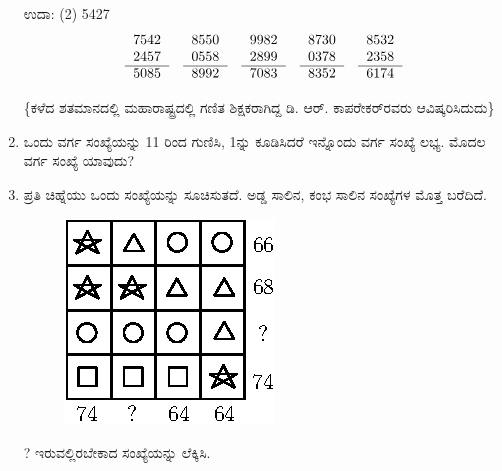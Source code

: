 \begin{enumerate}
ಉದಾ: (2) 5427
\begin{equation*}
\begin{tabular}[t]{r}
7542 \\
2457\\\cline{1-1} 
5085
\end{tabular}
\quad
\begin{tabular}[t]{r}
8550\\ 
0558\\\cline{1-1} 
8992
\end{tabular}
\quad
\begin{tabular}[t]{r}
9982\\ 
2899\\\cline{1-1} 
7083
\end{tabular}
\quad
\begin{tabular}[t]{r}
8730\\ 
0378\\\cline{1-1} 
8352
\end{tabular}
\quad
\begin{tabular}[t]{r}
8532\\ 
2358\\\cline{1-1} 
6174
\end{tabular}
\end{equation*}

\{ಕಳೆದ ಶತಮಾನದಲ್ಲಿ ಮಹಾರಾಷ್ಟ್ರದಲ್ಲಿ ಗಣಿತ ಶಿಕ್ಷಕರಾಗಿದ್ದ ಡಿ. ಆರ್. ಕಾಪರೇಕರ್‌ರವರು ಆವಿಷ್ಕರಿಸಿದುದು\}

\item  ಒಂದು ವರ್ಗ ಸಂಖ್ಯೆಯನ್ನು 11 ರಿಂದ ಗುಣಿಸಿ, 1ನ್ನು ಕೂಡಿಸಿದರೆ ಇನ್ನೊಂದು ವರ್ಗ ಸಂಖ್ಯೆ ಲಭ್ಯ. ಮೊದಲ ವರ್ಗ ಸಂಖ್ಯೆ ಯಾವುದು? 

\item ಪ್ರತಿ ಚಿಹ್ನೆಯು ಒಂದು ಸಂಖ್ಯೆಯನ್ನು ಸೂಚಿಸುತದೆ. ಅಡ್ಡ ಸಾಲಿನ, ಕಂಭ ಸಾಲಿನ ಸಂಖ್ಯೆಗಳ ಮೊತ್ತ ಬರೆದಿದೆ. 
\begin{figure}[H]
\centering
\includegraphics{images/chap6/q30.eps}
\end{figure}

? ಇರುವಲ್ಲಿರಬೇಕಾದ ಸಂಖ್ಯೆಯನ್ನು ಲೆಕ್ಕಿಸಿ. 
\end{enumerate}

